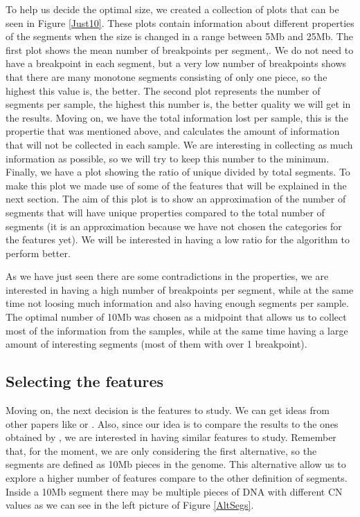 \documentclass[a4paper]{article}
\begin{document}
To help us decide the optimal size, we created a collection of plots that can be seen in Figure \ref{Just10}. These plots contain information about different properties of the segments when the size is changed in a range between 5Mb and 25Mb. The first plot shows the mean number of breakpoints per segment,. We do not need to have a breakpoint in each segment, but a very low number of breakpoints shows that there are many monotone segments consisting of only one piece, so the highest this value is, the better. The second plot represents the number of segments per sample, the highest this number is, the better quality we will get in the results. Moving on, we have the total information lost per sample, this is the propertie that was mentioned above, and calculates the amount of information that will not be collected in each sample. We are interesting in collecting as much information as possible, so we will try to keep this number to the minimum. Finally, we have a plot showing the ratio of unique divided by total segments. To make this plot we made use of some of the features that will be explained in the next section. The aim of this plot is to show an approximation of the number of segments that will have unique properties compared to the total number of segments (it is an approximation because we have not chosen the categories for the features yet). We will be interested in having a low ratio for the algorithm to perform better.

As we have just seen there are some contradictions in the properties, we are interested in having a high number of breakpoints per segment, while at the same time not loosing much information and also having enough segments per sample. The optimal number of 10Mb was chosen as a midpoint that allows us to collect most of the information from the samples, while at the same time having a large amount of interesting segments (most of them with over 1 breakpoint). 

\subsection{Selecting the features}
Moving on, the next decision is the features to study. We can get ideas from other papers like \cite{Geoff} or \cite{CGRs}. Also, since our idea is to compare the results to the ones obtained by \cite{Geoff}, we are interested in having similar features to study. Remember that, for the moment, we are only considering the first alternative, so the segments are defined as 10Mb pieces in the genome. This alternative allow us to explore a higher number of features compare to the other definition of segments. Inside a 10Mb segment there may be multiple pieces of DNA with different CN values as we can see in the left picture of Figure \ref{AltSegs}. 
\end{document}
